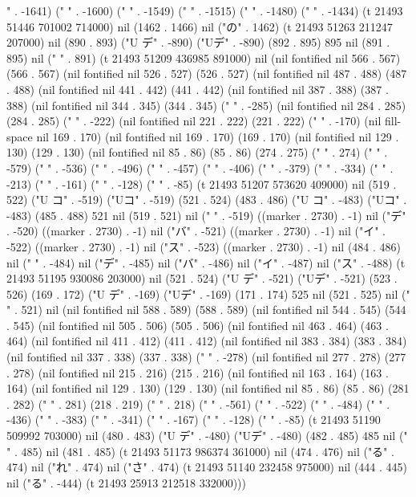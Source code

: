 " . -1641) ("
" . -1600) ("
" . -1549) ("
" . -1515) ("
" . -1480) ("
" . -1434) (t 21493 51446 701002 714000) nil (1462 . 1466) nil ("の" . 1462) (t 21493 51263 211247 207000) nil (890 . 893) ("U デ" . -890) ("Uデ" . -890) (892 . 895) 895 nil (891 . 895) nil (" " . 891) (t 21493 51209 436985 891000) nil (nil fontified nil 566 . 567) (566 . 567) (nil fontified nil 526 . 527) (526 . 527) (nil fontified nil 487 . 488) (487 . 488) (nil fontified nil 441 . 442) (441 . 442) (nil fontified nil 387 . 388) (387 . 388) (nil fontified nil 344 . 345) (344 . 345) (" " . -285) (nil fontified nil 284 . 285) (284 . 285) (" " . -222) (nil fontified nil 221 . 222) (221 . 222) (" " . -170) (nil fill-space nil 169 . 170) (nil fontified nil 169 . 170) (169 . 170) (nil fontified nil 129 . 130) (129 . 130) (nil fontified nil 85 . 86) (85 . 86) (274 . 275) ("
" . 274) ("
" . -579) ("
" . -536) ("
" . -496) ("
" . -457) ("
" . -406) ("
" . -379) ("
" . -334) ("
" . -213) ("
" . -161) ("
" . -128) ("
" . -85) (t 21493 51207 573620 409000) nil (519 . 522) ("U コ" . -519) ("Uコ" . -519) (521 . 524) (483 . 486) ("U コ" . -483) ("Uコ" . -483) (485 . 488) 521 nil (519 . 521) nil (" " . -519) ((marker . 2730) . -1) nil ("デ" . -520) ((marker . 2730) . -1) nil ("バ" . -521) ((marker . 2730) . -1) nil ("イ" . -522) ((marker . 2730) . -1) nil ("ス" . -523) ((marker . 2730) . -1) nil (484 . 486) nil (" " . -484) nil ("デ" . -485) nil ("バ" . -486) nil ("イ" . -487) nil ("ス" . -488) (t 21493 51195 930086 203000) nil (521 . 524) ("U デ" . -521) ("Uデ" . -521) (523 . 526) (169 . 172) ("U デ" . -169) ("Uデ" . -169) (171 . 174) 525 nil (521 . 525) nil (" " . 521) nil (nil fontified nil 588 . 589) (588 . 589) (nil fontified nil 544 . 545) (544 . 545) (nil fontified nil 505 . 506) (505 . 506) (nil fontified nil 463 . 464) (463 . 464) (nil fontified nil 411 . 412) (411 . 412) (nil fontified nil 383 . 384) (383 . 384) (nil fontified nil 337 . 338) (337 . 338) (" " . -278) (nil fontified nil 277 . 278) (277 . 278) (nil fontified nil 215 . 216) (215 . 216) (nil fontified nil 163 . 164) (163 . 164) (nil fontified nil 129 . 130) (129 . 130) (nil fontified nil 85 . 86) (85 . 86) (281 . 282) ("
" . 281) (218 . 219) ("
" . 218) ("
" . -561) ("
" . -522) ("
" . -484) ("
" . -436) ("
" . -383) ("
" . -341) ("
" . -167) ("
" . -128) ("
" . -85) (t 21493 51190 509992 703000) nil (480 . 483) ("U デ" . -480) ("Uデ" . -480) (482 . 485) 485 nil (" " . 485) nil (481 . 485) (t 21493 51173 986374 361000) nil (474 . 476) nil ("る" . 474) nil ("れ" . 474) nil ("さ" . 474) (t 21493 51140 232458 975000) nil (444 . 445) nil ("る" . -444) (t 21493 25913 212518 332000)))
